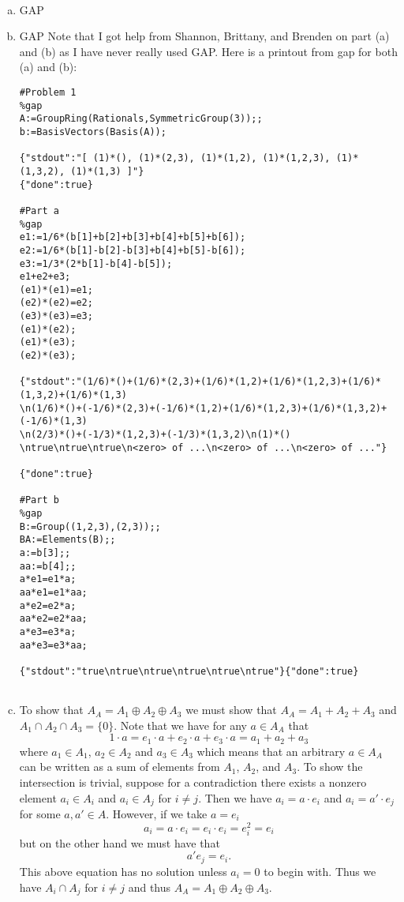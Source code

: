 \documentclass[leqno]{article}
\begin{document}
\begin{solution}~
\begin{enumerate}[(a)]
    \item \textsf{GAP}
    \item \textsf{GAP}
    Note that I got help from Shannon, Brittany, and Brenden on part (a) and (b) as I have never really used \textsf{GAP}. Here is a printout from gap for both (a) and (b):
\begin{verbatim}
#Problem 1
%gap
A:=GroupRing(Rationals,SymmetricGroup(3));;
b:=BasisVectors(Basis(A));

{"stdout":"[ (1)*(), (1)*(2,3), (1)*(1,2), (1)*(1,2,3), (1)*(1,3,2), (1)*(1,3) ]"}
{"done":true}

#Part a
%gap
e1:=1/6*(b[1]+b[2]+b[3]+b[4]+b[5]+b[6]);
e2:=1/6*(b[1]-b[2]-b[3]+b[4]+b[5]-b[6]);
e3:=1/3*(2*b[1]-b[4]-b[5]);
e1+e2+e3;
(e1)*(e1)=e1;
(e2)*(e2)=e2;
(e3)*(e3)=e3;
(e1)*(e2);
(e1)*(e3);
(e2)*(e3);

{"stdout":"(1/6)*()+(1/6)*(2,3)+(1/6)*(1,2)+(1/6)*(1,2,3)+(1/6)*(1,3,2)+(1/6)*(1,3)
\n(1/6)*()+(-1/6)*(2,3)+(-1/6)*(1,2)+(1/6)*(1,2,3)+(1/6)*(1,3,2)+(-1/6)*(1,3)
\n(2/3)*()+(-1/3)*(1,2,3)+(-1/3)*(1,3,2)\n(1)*()
\ntrue\ntrue\ntrue\n<zero> of ...\n<zero> of ...\n<zero> of ..."}

{"done":true}

#Part b
%gap
B:=Group((1,2,3),(2,3));;
BA:=Elements(B);;
a:=b[3];;
aa:=b[4];;
a*e1=e1*a;
aa*e1=e1*aa;
a*e2=e2*a;
aa*e2=e2*aa;
a*e3=e3*a;
aa*e3=e3*aa;

{"stdout":"true\ntrue\ntrue\ntrue\ntrue\ntrue"}{"done":true}
    
\end{verbatim}
    \item To show that $A_A = A_1 \oplus A_2 \oplus A_3$ we must show that $A_A= A_1 + A_2 + A_3$ and $A_1\cap A_2 \cap A_3=\{0\}$. Note that we have for any $a\in A_A$ that
    \[
    1\cdot a = e_1\cdot a + e_2 \cdot a + e_3 \cdot a = a_1 + a_2 + a_3
    \]
    where $a_1 \in A_1$, $a_2 \in A_2$ and $a_3 \in A_3$ which means that an arbitrary $a\in A_A$ can be written as a sum of elements from $A_1$, $A_2$, and $A_3$.  To show the intersection is trivial, suppose for a contradiction there exists a nonzero element $a_i\in A_i$ and $a_i\in A_j$ for $i\neq j$. Then we have $a_i = a\cdot e_i$ and $a_i = a'\cdot e_j$ for some $a, a'\in A$. However, if we take $a=e_i$
    \[
    a_i = a\cdot e_i = e_i \cdot e_i = e_i^2 = e_i
    \]
    but on the other hand we must have that
    \[
    a' e_j = e_i.
    \]
    This above equation has no solution unless $a_i=0$ to begin with. Thus we have $A_i\cap A_j$ for $i\neq j$ and thus $A_A = A_1 \oplus A_2 \oplus A_3$.
\end{enumerate}
\end{solution}
\end{document}
